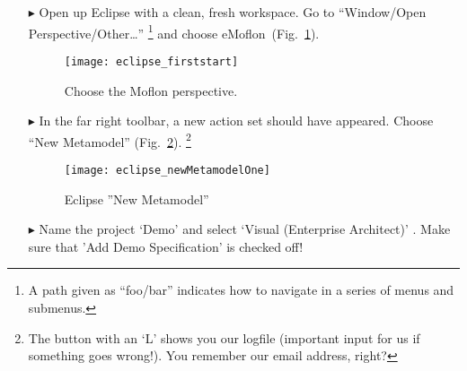 \begin{itemize}
\item[$\blacktriangleright$] Open up Eclipse with a clean, fresh workspace. Go to ``Window/Open Perspective/Other\ldots'' \footnote{A path given as ``foo/bar'' indicates how to navigate in a series of menus and submenus.} and choose eMoflon~(Fig.~\ref{fig_eclipse}).

\begin{figure}[htbp]
	\centering
  \texttt{[image: eclipse\_firststart]}
	\caption{Choose the Moflon perspective.}
	\label{fig_eclipse}
\end{figure} 

\item[$\blacktriangleright$] In the far right toolbar, a new action set should have appeared. Choose ``New Metamodel'' (Fig.~\ref{fig_eclipseNewMetamodel}).
\footnote{The button with an `L' shows you our logfile (important input for us if something goes wrong!). You remember our email address, right?}

\begin{figure}[htbp]
	\centering
  \texttt{[image: eclipse\_newMetamodelOne]}
	\caption{Eclipse ''New Metamodel''}
	\label{fig_eclipseNewMetamodel}
\end{figure}
 
\item[$\blacktriangleright$] Name the project `Demo' and select `Visual (Enterprise Architect)' . Make sure that 'Add Demo Specification' is checked off! 

\end{itemize}